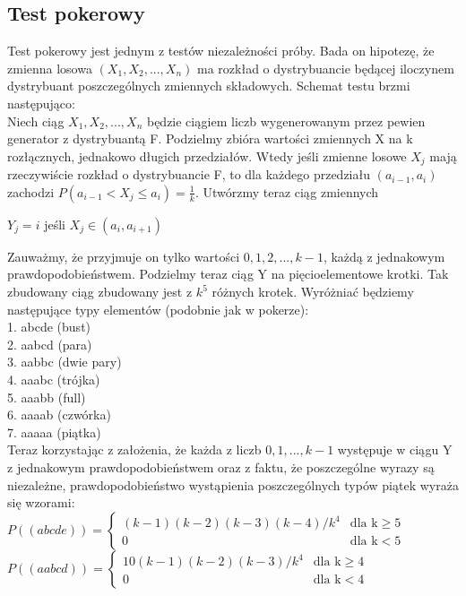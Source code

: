 \documentclass[a4paper]{scrartcl}
\begin{document}
\subsection{Test pokerowy}
\qquad Test pokerowy jest jednym z testów niezależności próby. Bada on hipotezę, że zmienna losowa $(X_1, X_2,...,X_n)$ ma rozkład o dystrybuancie będącej iloczynem dystrybuant poszczególnych zmiennych składowych. Schemat testu brzmi następująco:\\
\null\qquad Niech ciąg $X_1, X_2,...,X_n$ będzie ciągiem liczb wygenerowanym przez pewien generator z dystrybuantą F. Podzielmy zbióra wartości zmiennych X na k rozłącznych, jednakowo długich przedziałów. Wtedy jeśli zmienne losowe $X_j$ mają rzeczywiście rozkład o dystrybuancie F, to dla każdego przedziału $(a_{i-1}, a_i)$ zachodzi $P(a_{i-1} < X_j \leq a_i) = \frac{1}{k}$. Utwórzmy teraz ciąg zmiennych 
\begin{center}
$Y_j=i$ jeśli $X_j \in (a_i, a_{i+1})$
\end{center}
Zauważmy, że przyjmuje on tylko wartości $0, 1, 2,..., k-1$, każdą z jednakowym prawdopodobieństwem. Podzielmy teraz ciąg Y na pięcioelementowe krotki. Tak zbudowany ciąg zbudowany jest z $k^5$ różnych krotek. Wyróżniać będziemy następujące typy elementów (podobnie jak w pokerze):\\
1. abcde (bust)\\
2. aabcd (para)\\
3. aabbc (dwie pary)\\
4. aaabc (trójka)\\
5. aaabb (full)\\
6. aaaab (czwórka)\\
7. aaaaa (piątka)\\
Teraz korzystając z założenia, że każda z liczb $0,1,...,k-1$ występuje w ciągu Y z jednakowym prawdopodobieństwem oraz z faktu, że poszczególne wyrazy są niezależne, prawdopodobieństwo wystąpienia poszczególnych typów piątek wyraża się wzorami:\\
$P((abcde)) =
\begin{cases}
(k-1)(k-2)(k-3)(k-4)/k^4 &\text{dla k} \geq 5\\
0 & \text{dla k} < 5
\end{cases}$\\
$P((aabcd)) =
\begin{cases}
10(k-1)(k-2)(k-3)/k^4 &\text{dla k} \geq 4\\
0 & \text{dla k} < 4
\end{cases}$\\
\end{document}

